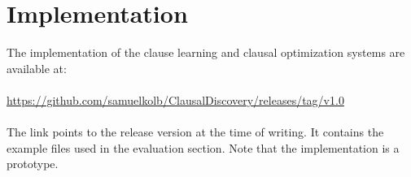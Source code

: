 \chapter{Implementation}
The implementation of the clause learning and clausal optimization systems are available at:
\\\\
\url{https://github.com/samuelkolb/ClausalDiscovery/releases/tag/v1.0}
\\\\
The link points to the release version at the time of writing.
It contains the example files used in the evaluation section.
Note that the implementation is a prototype.